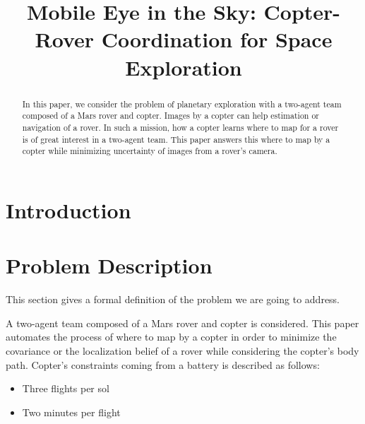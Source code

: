 \documentclass[conference]{IEEEtran}
\begin{document}
\title{\huge Mobile Eye in the Sky: Copter-Rover Coordination for Space Exploration}


\maketitle

\begin{abstract}
In this paper, we consider the problem of planetary exploration with a two-agent team composed of a Mars rover and copter. Images by a copter can help estimation or navigation of a rover. In such a mission, how a copter learns where to map for a rover is of great interest in a two-agent team. 
This paper answers this where to map by a copter while minimizing uncertainty of images from a rover’s camera.
\end{abstract}

\IEEEpeerreviewmaketitle

\section{Introduction}


\section{Problem Description}
This section gives a formal definition of the problem we are going to address. 

A two-agent team composed of a Mars rover and copter is considered. This paper automates the process of where to map by a copter in order to minimize the covariance or the localization belief of a rover while considering the copter’s body path.
Copter’s constraints coming from a battery is described as follows:
\begin{itemize}
    \item Three flights per sol
    \item Two minutes per flight
\end{itemize}
 
\end{document}
